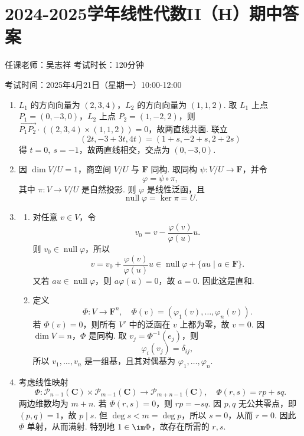 \section{2024-2025学年线性代数II（H）期中答案}

\begin{center}
    任课老师：吴志祥\hspace{4em} 考试时长：120分钟

    考试时间：2025年4月21日（星期一）10:00-12:00
\end{center}
\begin{enumerate}
    \item $L_1$ 的方向向量为 $(2,3,4)$，$L_2$ 的方向向量为 $(1,1,2)$. 取 $L_1$ 上点 $P_1=(0,-3,0)$，$L_2$ 上点 $P_2=(1,-2,2)$，则 $\overrightarrow{P_1P_2}\cdot((2,3,4)\times(1,1,2))=0$，故两直线共面. 联立
    \[
        (2t,-3+3t,4t)=(1+s,-2+s,2+2s)
    \]
    得 $t=0,\ s=-1$，故两直线相交，交点为 $(0,-3,0)$.

    \item 因 $\dim V/U=1$，商空间 $V/U$ 与 $\mathbf{F}$ 同构. 取同构 $\psi:V/U\to\mathbf{F}$，并令
    \[
        \varphi=\psi\circ\pi,
    \]
    其中 $\pi:V\to V/U$ 是自然投影. 则 $\varphi$ 是线性泛函，且
    \[
        \operatorname{null}\varphi=\ker\pi=U.
    \]

    \item
    \begin{enumerate}
        \item 对任意 $v\in V$，令
        \[
            v_0=v-\frac{\varphi(v)}{\varphi(u)}u.
        \]
        则 $v_0\in\operatorname{null}\varphi$，所以
        \[
            v=v_0+\frac{\varphi(v)}{\varphi(u)}u\in \operatorname{null}\varphi+\{au\mid a\in\mathbf{F}\}.
        \]
        又若 $au\in\operatorname{null}\varphi$，则 $a\varphi(u)=0$，故 $a=0$. 因此这是直和.

        \item 定义
        \[
            \Phi:V\to\mathbf{F}^n,\quad \Phi(v)=(\varphi_1(v),\ldots,\varphi_n(v)).
        \]
        若 $\Phi(v)=0$，则所有 $V'$ 中的泛函在 $v$ 上都为零，故 $v=0$. 因 $\dim V=n$，$\Phi$ 是同构. 取 $v_j=\Phi^{-1}(e_j)$，则
        \[
            \varphi_i(v_j)=\delta_{ij},
        \]
        所以 $v_1,\ldots,v_n$ 是一组基，且其对偶基为 $\varphi_1,\ldots,\varphi_n$.
    \end{enumerate}

    \item 考虑线性映射
    \[
        \Phi:\mathcal{P}_{n-1}(\mathbf{C})\times\mathcal{P}_{m-1}(\mathbf{C})
        \to \mathcal{P}_{m+n-1}(\mathbf{C}),
        \quad
        \Phi(r,s)=rp+sq.
    \]
    两边维数均为 $m+n$. 若 $\Phi(r,s)=0$，则 $rp=-sq$. 因 $p,q$ 无公共零点，即 $(p,q)=1$，故 $p\mid s$. 但 $\deg s<m=\deg p$，所以 $s=0$，从而 $r=0$. 因此 $\Phi$ 单射，从而满射. 特别地 $1\in\im\Phi$，故存在所需的 $r,s$.


\end{enumerate}
